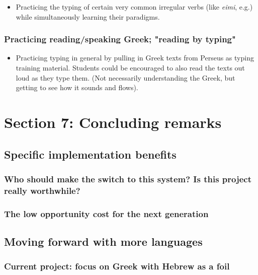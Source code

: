 \documentclass[11pt]{article}
\begin{document}
\begin{itemize}
\item Practicing the typing of certain very common irregular verbs (like \emph{eimi}, e.g.) while simultaneously learning their paradigms.
\end{itemize}

\subsubsection{Practicing reading/speaking Greek; "reading by typing"}
\label{sec:org506a70c}

\begin{itemize}
\item Practicing typing in general by pulling in Greek texts from Perseus as typing training material. Students could be encouraged to also read the texts out loud as they type them. (Not necessarily understanding the Greek, but getting to see how it sounds and flows).
\end{itemize}

\section{Section 7: Concluding remarks}
\label{sec:org501a7a2}

\subsection{Specific implementation benefits}
\label{sec:org43856be}

\subsubsection{Who should make the switch to this system? Is this project really worthwhile?}
\label{sec:org35efcfc}

\subsubsection{The low opportunity cost for the next generation}
\label{sec:org025c896}

\subsection{Moving forward with more languages}
\label{sec:org18370d4}

\subsubsection{Current project: focus on Greek with Hebrew as a foil}
\label{sec:org11307fd}
\end{document}
